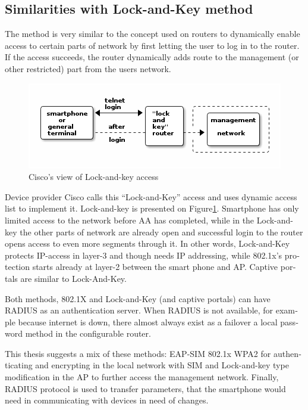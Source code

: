 \documentclass[12pt,a4paper,english]{tutthesis}
\begin{document}
\begin{otherlanguage}{english}
\section{Similarities with Lock-and-Key method}
\label{sec-4-4}
The method is very similar to the concept used on routers to dynamically enable
access to certain parts of network by first letting the user to log in
to the router. If the access succeeds, the router dynamically adds
route to the management (or other restricted) part from the 
users network.




\begin{figure}[htb]
\centering
\includegraphics[width=.9\linewidth]{lockandkey.png}
\caption{\label{fig:lock-and-view}Cisco's view of Lock-and-key access}
\end{figure}




Device provider Cisco calls this  ``Lock-and-Key''
access and uses dynamic access list to implement it\cite[p.117]{lockandkeybook}.
Lock-and-key is presented on Figure\ref{fig:lock-and-view}.
 Smartphone has only limited access to the network before AA
has completed, while in the Lock-and-key
the other parts of network are already open and successful login to the router opens
access to even more segments through it. In other words, Lock-and-Key
protects IP-access in layer-3 and though needs IP addressing, while
802.1x's protection starts already at layer-2 between the smart phone
and AP. Captive portals are similar to Lock-And-Key.


Both methods, 802.1X and Lock-and-Key (and captive portals) can have RADIUS as an authentication server. 
When RADIUS is not available, for example because internet is down,
there almost always exist as a failover a local password method in the configurable 
router.








This thesis suggests a mix of these methods: EAP-SIM 802.1x WPA2 for
authenticating and encrypting in the local network with SIM and
Lock-and-key type modification in the AP to further access the 
management network. Finally, RADIUS protocol is used to transfer 
parameters, that the smartphone would need in communicating with 
devices in need of changes.


\end{otherlanguage}
\end{document}

